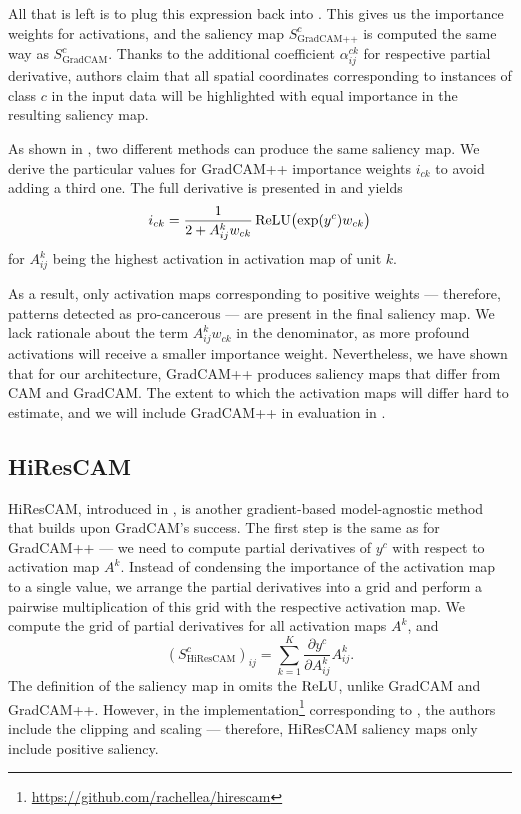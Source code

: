 All that is left is to plug this expression back into .
This gives us the importance weights for activations, and the saliency map $S^c_{\text{GradCAM++}}$ is computed the same way as $S^c_{\text{GradCAM}}$.
Thanks to the additional coefficient $\alpha^{ck}_{ij}$ for respective partial derivative, authors claim that all spatial coordinates corresponding to instances of class $c$ in the input data will be highlighted with equal importance in the resulting saliency map.

As shown in , two different methods can produce the same saliency map.
We derive the particular values for GradCAM++ importance weights $i_{ck}$ to avoid adding a third one.
The full derivative is presented in  and yields
\begin{equation}
    i_{ck} = \frac{1}{2 + A^k_{ij}w_{ck}} \operatorname{ReLU}\bigl(\exp(y^c)w_{ck}\bigr)
\end{equation}
for $A^k_{ij}$ being the highest activation in activation map of unit $k$.

As a result, only activation maps corresponding to positive weights --- therefore, patterns detected as pro-cancerous --- are present in the final saliency map.
We lack rationale about the term $A^k_{ij} w_{ck}$ in the denominator, as more profound activations will receive a smaller importance weight.
Nevertheless, we have shown that for our architecture, GradCAM++ produces saliency maps that differ from CAM and GradCAM.
The extent to which the activation maps will differ hard to estimate, and we will include GradCAM++ in evaluation in .

\subsection{HiResCAM}\label{sub:hirescam}

HiResCAM, introduced in \cite{hires-cam}, is another gradient-based model-agnostic method that builds upon GradCAM's success.
The first step is the same as for GradCAM++ --- we need to compute partial derivatives of $y^c$ with respect to activation map $A^k$.
Instead of condensing the importance of the activation map to a single value, we arrange the partial derivatives into a grid and perform a pairwise multiplication of this grid with the respective activation map.
We compute the grid of partial derivatives for all activation maps $A^k$, and
\begin{equation}
    (S^c_{\text{HiResCAM}})_{ij}
        = \sum_{k=1}^K \frac{\partial y^c}{\partial A^k_{ij}} A^k_{ij}.
\end{equation}
The definition of the saliency map in \cite{hires-cam} omits the $\operatorname{ReLU}$, unlike GradCAM and GradCAM++.
However, in the implementation\footnote{\url{https://github.com/rachellea/hirescam}} corresponding to \cite{hires-cam}, the authors include the clipping and scaling --- therefore, HiResCAM saliency maps only include positive saliency.

